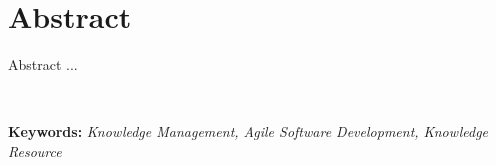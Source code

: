 \chapter*{Abstract}

\hspace{13pt}

Abstract ...

\hspace*{\fill} \\

\begin{flushleft}
\textbf{Keywords:} \textit{Knowledge Management, Agile Software Development, Knowledge Resource}
\end{flushleft}

